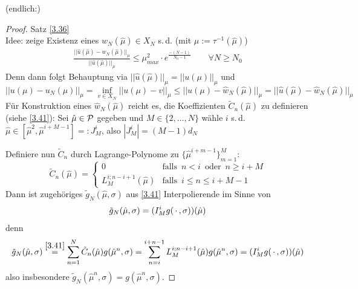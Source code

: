 (endlich:)
\begin{proof} Satz \ref{3.36}
\\ Idee: zeige Existenz eines $\hat{w}_N(\hat{\mu}) \in X_N$ s.\,d. (mit $\mu := \tau^{-1}(\hat{\mu})$)
\begin{align}
\label{eq:3.19}
	\frac{|| \hat{u}(\hat{\mu}) - \hat{w}_N (\hat{\mu}) ||_{\mu}}{|| \hat{u}(\hat{\mu}) ||_{\mu}} \leq \mu_{max}^2 \cdot e^{\frac{-(N-1)}{N_0 - 1}} \qquad \forall N \geq N_0
\end{align}
Denn dann folgt Behauptung via $||\hat{u}(\hat{\mu})||_{\mu} = || u(\mu) ||_{\mu}$ und
\[
	|| u(\mu) - u_N(\mu) ||_{\mu} = \inf_{v \in X_N} || u(\mu) - v ||_{\mu} \leq || u(\mu) - \hat{w}_N(\hat{\mu}) ||_{\mu} = || \hat{u}(\hat{\mu}) - \hat{w}_N(\hat{\mu}) ||_{\mu}
\]
Für Konstruktion eines $\hat{w}_N(\hat{\mu})$ reicht es, die Koeffizienten $\tilde{C}_n(\hat{\mu})$ zu definieren (siehe \ref{3.41}): Sei $\hat{\mu} \in \mathcal{P}$ gegeben und $M \in \{2,\dots,N\}$ wähle $i$ s.\,d. $\hat{\mu} \in [\hat{\mu}^2,\hat{\mu}^{i+M-1}] =: J_M^i$, also $|J_M^i| = (M-1) d_N$

Definiere nun $\tilde{C}_n$ durch Lagrange-Polynome zu $\{\hat{\mu}^{i+m-1}\}_{m=1}^M$:
\[
\tilde{C}_n(\hat{\mu}) = \begin{cases}
				0 & \text{falls} \,\,\, n< i \,\,\, \text{oder} \,\,\, n \geq i+M\\
				L_M^{i;n-i+1} (\hat{\mu}) & \text{falls} \,\,\, i \leq n \leq i+M-1
			\end{cases}
\]
Dann ist zugehöriges $\tilde{g}_N(\hat{\mu}, \sigma)$ aus \ref{3.41} Interpolierende im Sinne von
\[
	\tilde{g}_N(\hat{\mu}, \sigma) = (I_M^i g(\,\cdot\,,\sigma))(\hat{\mu})
\]
denn
\[
	\tilde{g}_N(\hat{\mu}, \sigma) \overset{\ref{3.41}}{=} \sum\limits_{n=1}^N \tilde{C}_n (\hat{\mu}) g(\hat{\mu}^n,\sigma) = \sum\limits_{n=i}^{i+n-1} L_M^{i;n-i+1} (\hat{\mu}) g(\hat{\mu}^n,\sigma) = (I_M^i g(\,\cdot\,,\sigma))(\hat{\mu})
\]
also insbesondere $\tilde{g}_N(\hat{\mu}^n, \sigma) = g(\hat{\mu}^n, \sigma)$.


\end{proof}
